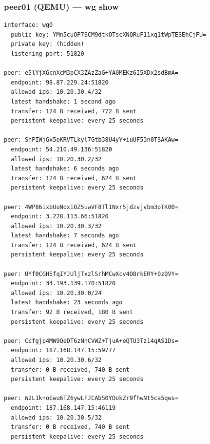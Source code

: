\documentclass[11pt,a4paper]{article}
\begin{document}
\subsubsection*{peer01 (QEMU) — wg show}
\begin{lstlisting}
interface: wg0
  public key: YMn5cuOP7SCM9dtkOTscXNQRuF11xq1tWpTESEhCjFU=
  private key: (hidden)
  listening port: 51820

peer: e5lYjXGcnXcM3pCX3ZAzZaG+YA0MEKz6I5XDx2sdBmA=
  endpoint: 98.87.229.24:51820
  allowed ips: 10.20.30.4/32
  latest handshake: 1 second ago
  transfer: 124 B received, 772 B sent
  persistent keepalive: every 25 seconds

peer: ShPIWjGx5oKRVTLkyl7Gtb38U4yY+iuUF53n0TSAKAw=
  endpoint: 54.210.49.136:51820
  allowed ips: 10.20.30.2/32
  latest handshake: 6 seconds ago
  transfer: 124 B received, 624 B sent
  persistent keepalive: every 25 seconds

peer: 4WP86ixbUuNoxiOZ5uwVF8Tl1Nxr5jdzvjvbm3oTK00=
  endpoint: 3.228.113.66:51820
  allowed ips: 10.20.30.3/32
  latest handshake: 7 seconds ago
  transfer: 124 B received, 624 B sent
  persistent keepalive: every 25 seconds

peer: UYf0CGH5fqIYJUljTxzlSrhMCwXcv4O8rkERY+0zQVY=
  endpoint: 34.193.139.170:51820
  allowed ips: 10.20.30.0/24
  latest handshake: 23 seconds ago
  transfer: 92 B received, 180 B sent
  persistent keepalive: every 25 seconds

peer: Ccfgjp4MW9QeDT6zNnCVWZ+TjuA+eQTU3Tz14qAS1Ds=
  endpoint: 187.168.147.15:59777
  allowed ips: 10.20.30.6/32
  transfer: 0 B received, 740 B sent
  persistent keepalive: every 25 seconds

peer: W2L1k+oEwu6TZ6ywLFJCAbS0YDokZr9fhwNt5ca5qws=
  endpoint: 187.168.147.15:46119
  allowed ips: 10.20.30.5/32
  transfer: 0 B received, 740 B sent
  persistent keepalive: every 25 seconds

\end{lstlisting}
\end{document}
